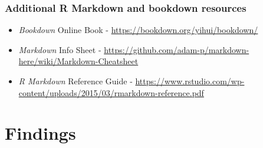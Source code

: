 \documentclass[12pt,oneside]{chicagocapstone}
\begin{document}
\hypertarget{additional-r-markdown-and-bookdown-resources}{%
\subsection*{Additional R Markdown and bookdown resources}\label{additional-r-markdown-and-bookdown-resources}}
\begin{itemize}
\item
  \emph{Bookdown} Online Book - \url{https://bookdown.org/yihui/bookdown/}
\item
  \emph{Markdown} Info Sheet - \url{https://github.com/adam-p/markdown-here/wiki/Markdown-Cheatsheet}
\item
  \emph{R Markdown} Reference Guide - \url{https://www.rstudio.com/wp-content/uploads/2015/03/rmarkdown-reference.pdf}
\end{itemize}
\hypertarget{findings}{%
\chapter*{Findings}\label{findings}}
\end{document}
